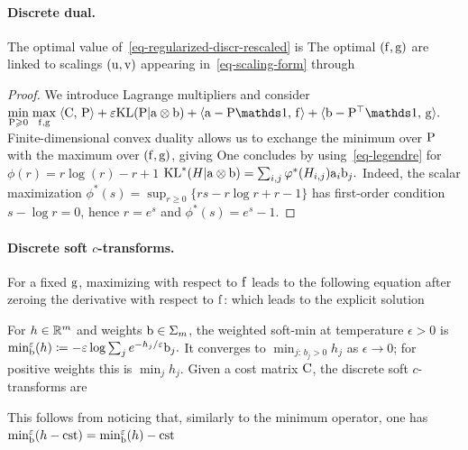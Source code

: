 \paragraph{Discrete dual.}
\begin{prop}
The optimal value of~\eqref{eq-regularized-discr-rescaled} is
The optimal $(\fD,\gD)$ are linked to scalings $(\uD,\vD)$ appearing in~\eqref{eq-scaling-form} through
\end{prop}
\begin{proof}
We introduce Lagrange multipliers and consider
\(\umin{\P \geq 0} \umax{\fD,\gD} \dotp{\C}{\P} + \epsilon \KLD(\P|\a \otimes \b) + \dotp{\a-\P\ones}{\fD} + \dotp{\b-\P^\top\ones}{\gD}.\)
Finite-dimensional convex duality allows us to exchange the minimum over $\P$ with the maximum over $(\fD,\gD)$, giving
One concludes by using~\eqref{eq-legendre} for $\phi(r)=r \log(r)-r+1$
\(\KLD^*(H|\a \otimes \b) = \sum_{i,j} \phi^*(H_{i,j}) \a_i \b_j.\)
Indeed, the scalar maximization
\(\phi^*(s)=\sup_{r\geq0}\{rs-r\log r+r-1\}\)
has first-order condition $s-\log r=0$, hence $r=e^s$ and $\phi^*(s)=e^s-1$.
\end{proof}
\paragraph{\texorpdfstring{Discrete soft $c$-transforms.}{Discrete soft c-transforms.}}
For a fixed $\gD$, maximizing with respect to $\fD$ leads to the following equation after zeroing the derivative with respect to $\fD$:
which leads to the explicit solution
\begin{defn}\label{def-discrete-soft-c-transform}
For $h\in\RR^m$ and weights $\b\in\simplex_m$, the weighted soft-min at temperature $\epsilon>0$ is \({\min}_{\b}^\epsilon(h) \eqdef -\epsilon \log \sum_j e^{-h_j/\epsilon} \b_j.\)
It converges to $\min_{j:\,b_j>0}h_j$ as $\epsilon\to0$; for positive weights this is $\min_jh_j$. Given a cost matrix $\C$, the discrete soft $c$-transforms are
\end{defn}
This follows from noticing that, similarly to the minimum operator, one has \({\min}_{\b}^\epsilon(h-\text{cst})={\min}_{\b}^\epsilon(h)-\text{cst}\)
